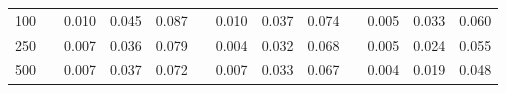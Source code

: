 % 
\begin{tabular}{ccccccccccccc}
  \hline
  \hline
100 &  & 0.010 & 0.045 & 0.087 &  & 0.010 & 0.037 & 0.074 &  & 0.005 & 0.033 & 0.060 \\ 
  250 &  & 0.007 & 0.036 & 0.079 &  & 0.004 & 0.032 & 0.068 &  & 0.005 & 0.024 & 0.055 \\ 
  500 &  & 0.007 & 0.037 & 0.072 &  & 0.007 & 0.033 & 0.067 &  & 0.004 & 0.019 & 0.048 \\ 
   \hline
\end{tabular}
